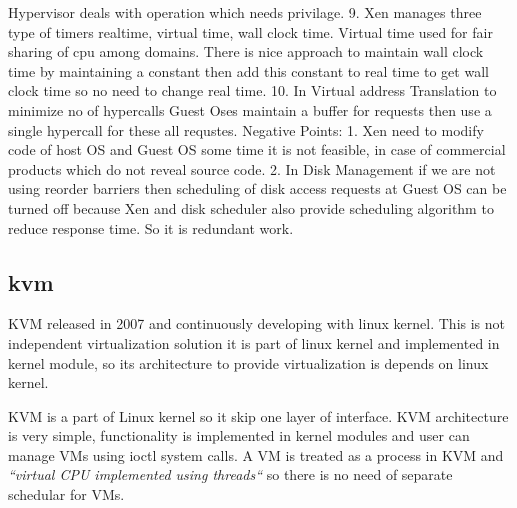 \documentclass[seminar,twoside]{iitbreport}
\begin{document}
Hypervisor deals with operation which needs privilage.
9. Xen manages three type of timers realtime, virtual time, wall clock time.
Virtual time used for fair sharing of cpu among domains.
There is nice approach to maintain wall clock time 
by maintaining a constant then add this constant to real time to get wall clock time 
so no need to change real time.
10. In Virtual address Translation to minimize no of hypercalls Guest Oses maintain a buffer for requests 
then use a single hypercall for these all requstes.
Negative Points: 1. Xen need to modify code of host OS and Guest OS some time it is not feasible, in case of commercial products
which do not reveal source code.
2. In Disk Management if we are not using reorder barriers then scheduling of disk access requests 
at Guest OS can be turned off because Xen and disk scheduler also provide 
scheduling algorithm to reduce response time. So it is redundant work.

\subsection{kvm} KVM released in 2007 and continuously developing with linux kernel.
This is not independent virtualization solution it is part of linux kernel and implemented in kernel module, so its architecture
to provide virtualization is depends on linux kernel.

KVM is a part of Linux kernel so it skip one layer of interface. KVM architecture is very simple,
functionality is implemented in kernel modules and user can manage VMs using ioctl system calls.
A VM is treated as a process in KVM and \emph{``virtual CPU implemented using threads``}\cite{xenkvm2014} so there is no need of separate
schedular for VMs.
\end{document}
